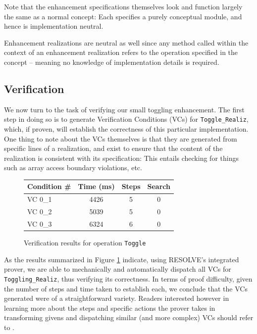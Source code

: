 Note that the enhancement specifications themselves look and function largely the same as a normal concept: Each specifies a purely conceptual module, and hence is implementation neutral. 

Enhancement realizations are neutral as well since any method called within the context of an enhancement realization refers to the operation specified in the concept -- meaning no knowledge of implementation details is required.

\subsection{Verification}

We now turn to the task of verifying our small toggling enhancement. The first step in doing so is to generate Verification Conditions (VCs) for \texttt{Toggle\_Realiz}, which, if proven, will establish the correctness of this particular implementation. One thing to note about the VCs themselves is that they are generated from specific lines of a realization, and exist to ensure that the content of the realization is consistent with its specification: This entails checking for things such as array access boundary violations, etc.  

\begin{figure}[!htb]
\centering
\begin{tabular}{lccc}
	\toprule
	Condition \# & Time (ms)	& Steps	& Search \\
	\midrule
	VC 0\_1	& 4426	& 5	& 0	\\
	VC 0\_2	& 5039	& 5	& 0	\\
	VC 0\_3	& 6324	& 6	& 0	\\
	\bottomrule
\end{tabular}
\caption{Verification results for operation \texttt{Toggle}}
\label{fig:results}
\end{figure}

As the results summarized in Figure \ref{fig:results} indicate, using RESOLVE's integrated prover, we are able to mechanically and automatically dispatch all VCs for \texttt{Toggling\_Realiz}, thus verifying its correctness. In terms of proof difficulty, given the number of steps and time taken to establish each, we conclude that the VCs generated were of a straightforward variety. Readers interested however in learning more about the steps and specific actions the prover takes in transforming givens and dispatching similar (and more complex) VCs should refer to \cite{smith:2013}.

